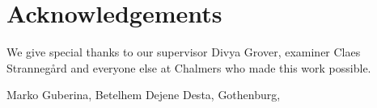 \thispagestyle{plain}			%
\section*{Acknowledgements}
We give special thanks to our supervisor Divya Grover, examiner Claes Strannegård
and everyone else at Chalmers who made this work possible.

\vspace{1.5cm}
\hfill
Marko Guberina, Betelhem Dejene Desta, Gothenburg, \monthname \space \the\year

\newpage				%
\thispagestyle{empty}
\mbox{}
